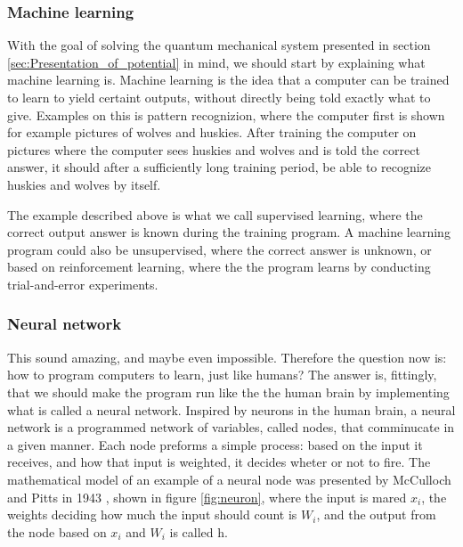 \documentclass[norsk,a4paper,12pt]{article}
\begin{document}
\subsubsection{Machine learning}
With the goal of solving the quantum mechanical system presented in section \ref{sec:Presentation_of_potential} in mind, we should start by explaining what machine learning is. Machine learning is the idea that a computer can be trained to learn to yield certaint outputs, without directly being told exactly what to give. Examples on this is pattern recognizion, where the computer first is shown for example pictures of wolves and huskies. After training the computer on pictures where the computer sees huskies and wolves and is told the correct answer, it should after a sufficiently long training period, be able to recognize huskies and wolves by itself. 
\par 
\vspace{3mm}
The example described above is what we call supervised learning, where the correct output answer is known during the training program. A machine learning program could also be unsupervised, where the correct answer is unknown, or based on reinforcement learning, where the the program learns by conducting trial-and-error experiments. 
\par 
\vspace{3mm}

\subsubsection{Neural network}

 This sound amazing, and maybe even impossible. Therefore the question now is: how to program computers to learn, just like humans? The answer is, fittingly, that we should make the program run like the the human brain by implementing what is called a neural network. Inspired by neurons in the human brain, a neural network is a programmed network of variables, called nodes, that comminucate in a given manner. Each node preforms a simple process: based on the input it receives, and how that input is weighted, it decides wheter or not to fire. The mathematical model of an example of a neural node was presented by McCulloch and Pitts in 1943 \cite{Marsland}, shown in figure \ref{fig:neuron}, where the input is mared $x_i$, the weights deciding how much the input should count is $W_i$, and the output from the node based on $x_i$ and $W_i$ is called h. 
\end{document}
